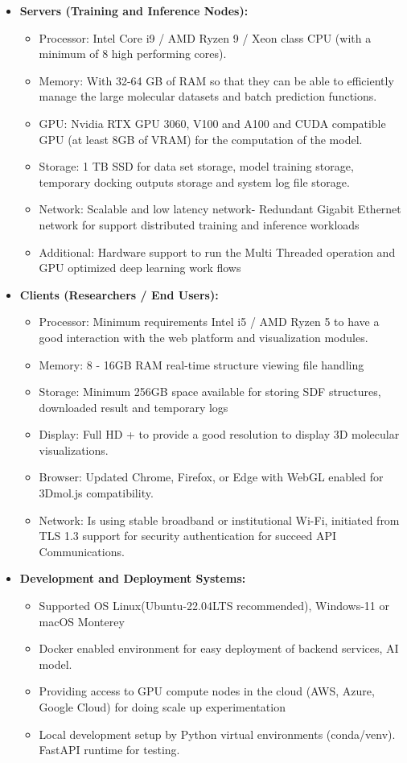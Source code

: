 \documentclass[12pt,a4]{report}
\begin{document}
\begin{itemize}
\item \textbf{Servers (Training and Inference Nodes):}
\begin{itemize}
\item Processor: Intel Core i9 / AMD Ryzen 9 / Xeon class CPU (with a minimum of 8 high performing cores).
\item Memory: With 32-64 GB of RAM so that they can be able to efficiently manage the large molecular datasets and batch prediction functions.
\item GPU: Nvidia RTX GPU 3060, V100 and A100 and CUDA compatible GPU (at least 8GB of VRAM) for the computation of the model.
\item Storage: 1 TB SSD for data set storage, model training storage, temporary docking outputs storage and system log file storage.
\item Network: Scalable and low latency network- Redundant Gigabit Ethernet network for support distributed training and inference workloads
\item Additional: Hardware support to run the Multi Threaded operation and GPU optimized deep learning work flows
\end{itemize}

\item \textbf{Clients (Researchers / End Users):}
\begin{itemize}
\item Processor: Minimum requirements Intel i5 / AMD Ryzen 5 to have a good interaction with the web platform and visualization modules.
\item Memory: 8 - 16GB RAM real-time structure viewing file handling
\item Storage: Minimum 256GB space available for storing SDF structures, downloaded result and temporary logs
\item Display: Full HD + to provide a good resolution to display 3D molecular visualizations.
\item Browser: Updated Chrome, Firefox, or Edge with WebGL enabled for 3Dmol.js compatibility.
\item Network: Is using stable broadband or institutional Wi-Fi, initiated from TLS 1.3 support for security authentication for succeed API Communications.
\end{itemize}

\item \textbf{Development and Deployment Systems:}
\begin{itemize}
\item Supported OS Linux(Ubuntu-22.04LTS recommended), Windows-11 or macOS Monterey
\item Docker enabled environment for easy deployment of backend services, AI model.
\item Providing access to GPU compute nodes in the cloud (AWS, Azure, Google Cloud) for doing scale up experimentation
\item Local development setup by Python virtual environments (conda/venv). FastAPI runtime for testing.
\end{itemize}


\end{itemize}
\end{document}
